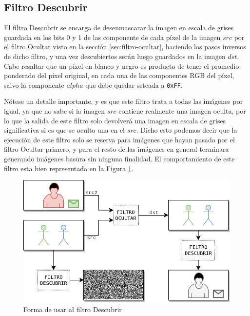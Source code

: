 \documentclass[a4paper]{article}
\begin{document}
\subsection{Filtro Descubrir}

El filtro Descubrir se encarga de desenmascarar la imagen en escala de grises guardada en los bits 0 y 1 de las componente de cada píxel de la imagen $src$ por el filtro Ocultar visto en la sección \ref{sec:filtro-ocultar}, haciendo los pasos inversos de dicho filtro, y una vez descubiertos serán luego guardados en la imagen $dst$. Cabe resaltar que un píxel en blanco y negro es producto de tener el promedio ponderado del píxel original, en cada una de las componentes RGB del píxel, salvo la componente $alpha$ que debe quedar seteada a \texttt{0xFF}.

Nótese un detalle importante, y es que este filtro trata a todas las imágenes por igual, ya que no sabe si la imagen $src$ contiene realmente una imagen oculta, por lo que la salida de este filtro solo devolverá una imagen en escala de grises significativa si es que se oculto una en el $src$. Dicho esto podemos decir que la ejecución de este filtro solo se reserva para imágenes que hayan pasado por el filtro Ocultar primero, y para el resto de las imágenes en general terminara generando imágenes basura sin ninguna finalidad. El comportamiento de este filtro esta bien representado en la Figura \ref{fig:filtro-descubrir-0}.

\begin{figure}[h!]
  \begin{center}
	\includegraphics[scale=0.44]{images/filtro-descubrir-0.png}
	\caption{Forma de usar al filtro Descubrir}
	\label{fig:filtro-descubrir-0}
  \end{center}
\end{figure}
\end{document}
